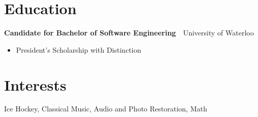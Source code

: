 \documentclass[oneside, 11pt]{memoir}
\newcommand{\entryGeneral}[4]{
  \begin{adjustwidth}{0.3em}{0em}%
  \textbf{#1}~\cdot~#2\sourceatright{\Date \small #3}%
  \begin{adjustwidth}{0.5em}{2.5em}
    \begin{flushleft}
      {\Merriweather \small #4}%
    \end{flushleft}
  \end{adjustwidth}
  \end{adjustwidth}
}
\begin{document}
\section*{Education}
\entryGeneral{Candidate for Bachelor of Software Engineering}{University of Waterloo}{2022}{
    \begin{itemize}
        \itemsep 0.3em
        \item{
            President’s Scholarship with Distinction
        }
    \end{itemize}
}

\section*{Interests}
{
    \Merriweather \small \quad \quad \quad Ice Hockey, Classical Music, Audio and Photo Restoration, Math
}


%
\end{document}
